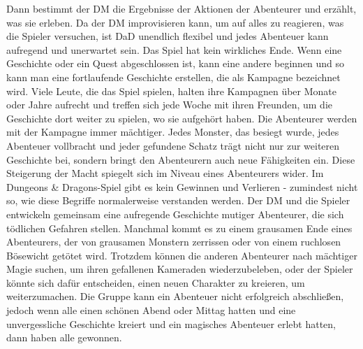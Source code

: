 Dann bestimmt der DM die Ergebnisse der Aktionen der Abenteurer und erzählt, was sie erleben. Da der DM improvisieren kann, um auf alles zu reagieren, was die Spieler versuchen, ist DaD unendlich flexibel und jedes Abenteuer kann aufregend und unerwartet sein. Das Spiel hat kein wirkliches Ende. Wenn eine Geschichte oder ein Quest abgeschlossen ist, kann eine andere beginnen und so kann man eine fortlaufende Geschichte erstellen, die als Kampagne bezeichnet wird. Viele Leute, die das Spiel spielen, halten ihre Kampagnen über Monate oder Jahre aufrecht und treffen sich jede Woche mit ihren Freunden, um die Geschichte dort weiter zu spielen, wo sie aufgehört haben. Die Abenteurer werden mit der Kampagne immer mächtiger. Jedes Monster, das besiegt wurde, jedes Abenteuer vollbracht und jeder gefundene Schatz trägt nicht nur zur weiteren Geschichte bei, sondern bringt den Abenteurern auch neue Fähigkeiten ein. Diese Steigerung der Macht spiegelt sich im Niveau eines Abenteurers wider. Im Dungeons & Dragons-Spiel gibt es kein Gewinnen und Verlieren - zumindest nicht so, wie diese Begriffe normalerweise verstanden werden. Der DM und die Spieler entwickeln gemeinsam eine aufregende Geschichte mutiger Abenteurer, die sich tödlichen Gefahren stellen. Manchmal kommt es zu einem grausamen Ende eines Abenteurers, der von grausamen Monstern zerrissen oder von einem ruchlosen Bösewicht getötet wird. Trotzdem können die anderen Abenteurer nach mächtiger Magie suchen, um ihren gefallenen Kameraden wiederzubeleben, oder der Spieler könnte sich dafür entscheiden, einen neuen Charakter zu kreieren, um weiterzumachen. Die Gruppe kann ein Abenteuer nicht erfolgreich abschließen, jedoch wenn alle einen schönen Abend oder Mittag hatten und eine unvergessliche Geschichte kreiert und ein magisches Abenteuer erlebt hatten, dann haben alle gewonnen.

